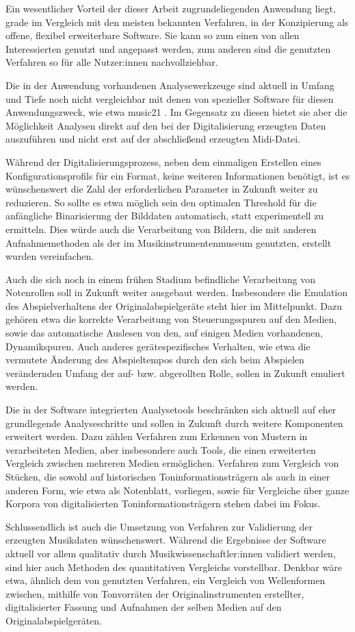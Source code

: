 Ein wesentlicher Vorteil der dieser Arbeit zugrundeliegenden Anwendung liegt, grade im Vergleich mit den meisten bekannten Verfahren, in der Konzipierung als offene, flexibel erweiterbare Software.
Sie kann so zum einen von allen Interessierten genutzt und angepasst werden, zum anderen sind die genutzten Verfahren so für alle Nutzer:innen nachvollziehbar.

Die in der Anwendung vorhandenen Analysewerkzeuge sind aktuell in Umfang und Tiefe noch nicht vergleichbar mit denen von spezieller Software für diesen Anwendungszweck, wie etwa music21 \parencite[]{music21}.
Im Gegensatz zu diesen bietet sie aber die Möglichkeit Analysen direkt auf den bei der Digitalisierung erzeugten Daten auszuführen und nicht erst auf der abschließend erzeugten Midi-Datei.

Während der Digitalisierungsprozess, neben dem einmaligen Erstellen eines Konfigurationsprofils für ein Format, keine weiteren Informationen benötigt, ist es wünschenswert die Zahl der erforderlichen Parameter in Zukunft weiter zu reduzieren.
So sollte es etwa möglich sein den optimalen Threshold für die anfängliche Binarisierung der Bilddaten automatisch, statt experimentell zu ermitteln.
Dies würde auch die Verarbeitung von Bildern, die mit anderen Aufnahmemethoden als der im Musikinstrumentenmuseum genutzten, erstellt wurden vereinfachen.

Auch die sich noch in einem frühen Stadium befindliche Verarbeitung von Notenrollen soll in Zukunft weiter ausgebaut werden.
Insbesondere die Emulation des Abspielverhaltens der Originalabspielgeräte steht hier im Mittelpunkt.
Dazu gehören etwa die korrekte Verarbeitung von Steuerungsspuren auf den Medien, sowie das automatische Auslesen von den, auf einigen Medien vorhandenen, Dynamikspuren.
Auch anderes gerätespezifisches Verhalten, wie etwa die vermutete Änderung des Abspieltempos durch den sich beim Abspielen verändernden Umfang der auf- bzw. abgerollten Rolle, sollen in Zukunft emuliert werden.

Die in der Software integrierten Analysetools beschränken sich aktuell auf eher grundlegende Analyseschritte und sollen in Zukunft durch weitere Komponenten erweitert werden.
Dazu zählen Verfahren zum Erkennen von Mustern in verarbeiteten Medien, aber insbesondere auch Tools, die einen erweiterten Vergleich zwischen mehreren Medien ermöglichen.
Verfahren zum Vergleich von Stücken, die sowohl auf historischen Toninformationsträgern als auch in einer anderen Form, wie etwa als Notenblatt, vorliegen, sowie für Vergleiche über ganze Korpora von digitalisierten Toninformationsträgern stehen dabei im Fokus. 

Schlussendlich ist auch die Umsetzung von Verfahren zur Validierung der erzeugten Musikdaten wünschenswert.
Während die Ergebnisse der Software aktuell vor allem qualitativ durch Musikwissenschaftler:innen validiert werden, sind hier auch Methoden des quantitativen Vergleichs vorstellbar.
Denkbar wäre etwa, ähnlich dem von \textcite[]{colmenares_2011} genutzten Verfahren, ein Vergleich von Wellenformen zwischen, mithilfe von Tonvorräten der Originalinstrumenten erstellter, digitalisierter Fassung und Aufnahmen der selben Medien auf den Originalabspielgeräten.